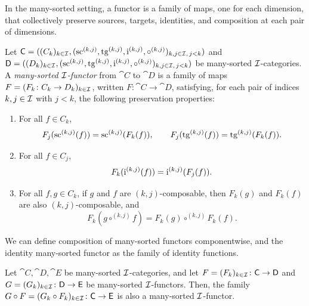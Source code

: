 In the many-sorted setting, a functor is a family of maps, one for each dimension, that collectively
preserve sources, targets, identities, and composition at each pair of dimensions.

\begin{definition}
  \label{def:ManySortedFunctor}
  \leanok
  Let $\mathsf{C} = ((C_k)_{k \in \mathcal{I}}, (\operatorname{sc}^{(k,j)}, \operatorname{tg}^{(k,j)}, \operatorname{i}^{(k,j)}, \circ^{(k,j)})_{k,
  j \in \mathcal{I}, \, j < k})$ and $\mathsf{D} = ((D_k)_{k \in \mathcal{I}}, (\operatorname{sc}^{(k,j)}, \operatorname{tg}^{(k,j)},
  \operatorname{i}^{(k,j)}, \circ^{(k,j)})_{k, j \in \mathcal{I}, \, j < k})$ be many-sorted $\mathcal{I}$-categories. A
  \emph{many-sorted $\mathcal{I}$-functor} from $\cat{C}$ to $\cat{D}$ is a family of maps $F = (F_k
  \colon C_k \to D_k)_{k \in \mathcal{I}}$, written $F \colon \cat{C} \to \cat{D}$, satisfying, for each
  pair of indices $k, j \in \mathcal{I}$ with $j < k$, the following preservation properties:

  \begin{enumerate}
    \item \label{ax:ms_fun_sc_tg} For all $f \in C_k$,
      \[
        F_j (\operatorname{sc}^{(k,j)} (f)) = \operatorname{sc}^{(k,j)} (F_k (f)), \qquad
        F_j (\operatorname{tg}^{(k,j)} (f)) = \operatorname{tg}^{(k,j)} (F_k (f)).
      \]
    \item \label{ax:ms_fun_idm} For all $f \in C_j$,
      \[
        F_k (\operatorname{i}^{(k,j)} (f)) = \operatorname{i}^{(k,j)} (F_j (f)).
      \]
    \item \label{ax:ms_fun_comp} For all $f, g \in C_k$, if $g$ and $f$ are
      $(k,j)$-composable, then $F_k (g)$ and $F_k (f)$ are also $(k,j)$-composable, and
      \[
        F_k (g \circ^{(k,j)} f) = F_k (g) \circ^{(k,j)} F_k (f).
      \]
  \end{enumerate}
\end{definition}

We can define composition of many-sorted functors componentwise, and the identity many-sorted
functor as the family of identity functions.

\begin{construction}
  \label{def:ManySortedFunctor_comp}
  \leanok
  Let $\cat{C}, \cat{D}, \cat{E}$ be many-sorted $\mathcal{I}$-categories, and let $F = (F_k)_{k \in
  \mathcal{I}} \colon \mathsf{C} \to \mathsf{D}$ and $G = (G_k)_{k \in \mathcal{I}} \colon \mathsf{D} \to \mathsf{E}$ be
  many-sorted $\mathcal{I}$-functors. Then, the family $G \circ F = (G_k \circ F_k)_{k \in \mathcal{I}} \colon
  \mathsf{C} \to \mathsf{E}$ is also a many-sorted $\mathcal{I}$-functor.
\end{construction}

